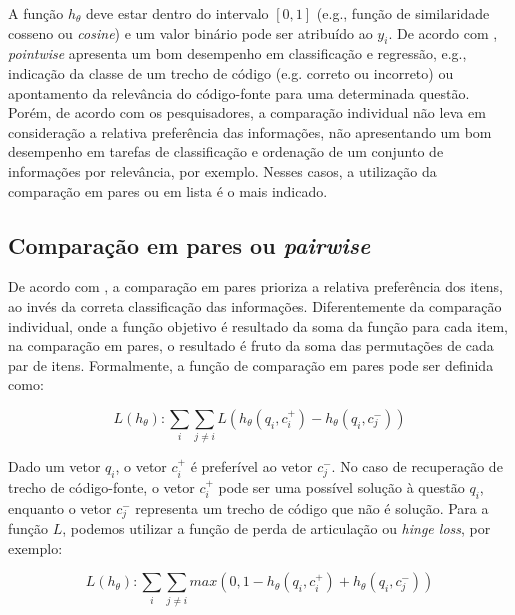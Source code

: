 A função $h_{\theta}$ deve estar dentro do intervalo $[0, 1]$ (e.g., função de similaridade cosseno ou \textit{cosine}) e um valor binário pode ser atribuído ao $y_{i}$. De acordo com \cite{guo-deep-look-into-neural-ranking-models:2019, wu-sql-rank-listwise-approach:2018},  \textit{pointwise} apresenta um bom desempenho em classificação e regressão, e.g., indicação da classe de um trecho de código (e.g. correto ou incorreto) ou apontamento da relevância do código-fonte para uma determinada questão. Porém, de acordo com os pesquisadores, a comparação individual não leva em consideração a relativa preferência das informações, não apresentando um bom desempenho em tarefas de classificação e ordenação de um conjunto de informações por relevância, por exemplo. Nesses casos, a utilização da comparação em pares ou em lista é o mais indicado.


\subsection{Comparação em pares ou \textit{pairwise}}
\label{sec:secao-comparacao-em-pares-pairwise}

De acordo com \cite{guo-deep-look-into-neural-ranking-models:2019}, a comparação em pares prioriza a relativa preferência dos itens, ao invés da correta classificação das informações. Diferentemente da comparação individual, onde a função objetivo é resultado da soma da função para cada item, na comparação em pares, o resultado é fruto da soma das permutações de cada par de itens. Formalmente, a função de comparação em pares pode ser definida como:

\begin{equation}
    L (h_{\theta}): \sum_{i} \sum_{j \neq i} L( h_{\theta}(q_{i}, c_{i}^{+}) - h_{\theta}(q_{i}, c_{j}^{-})) 
\end{equation}

 Dado um vetor $q_{i}$, o vetor $c_{i}^{+}$ é preferível ao vetor $c_{j}^{-}$. No caso de recuperação de trecho de código-fonte, o vetor $c_{i}^{+}$ pode ser uma possível solução à questão $q_{i}$, enquanto o vetor $c_{j}^{-}$ representa um trecho de código que não é solução. Para a função $L$, podemos utilizar a função de perda de articulação ou \textit{hinge loss}, por exemplo:

\begin{equation}
    L (h_{\theta}): \sum_{i} \sum_{j \neq i} max(0, 1 - h_{\theta}(q_{i}, c_{i}^{+}) + h_{\theta}(q_{i}, c_{j}^{-})) 
\end{equation}


